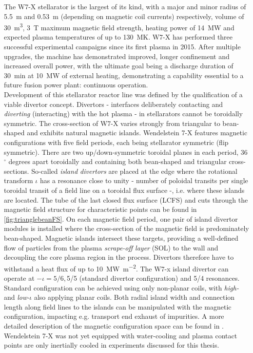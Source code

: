         The W7-X stellarator is the largest of its kind, with a major and minor radius of \SI{5.5}{\meter} and \SI{0.53}{\meter} (depending on magnetic coil currents) respectively, volume of \SI{30}{\cubic\meter}, \SI{3}{\tesla} maximum magnetic field strength, heating power of \SI{14}{\mega\watt} and expected plasma temperatures of up to \SI{130}{\mega\kelvin}. W7-X has performed three successful experimental campaigns since its first plasma in 2015. After multiple upgrades, the machine has demonstrated improved, longer confinement and increased overall power, with the ultimate goal being a discharge duration of \SI{30}{\minute} at \SI{10}{\mega\watt} of external heating, demonstrating a capability essential to a future fusion power plant: continuous operation\cite{Klinger2016_2}.\\%
        Development of this stellarator reactor line was defined by the qualification of a viable divertor concept. Divertors - interfaces deliberately contacting and \textit{diverting} (interacting) with the hot plasma - in stellarators cannot be toroidally symmetric. The cross-section of W7-X varies strongly from triangular to bean-shaped and exhibits natural magnetic islands. Wendelstein 7-X features magnetic configurations with five field periods, each being stellarator symmetric (flip symmetric). There are two up/down-symmetric toroidal planes in each period, 36$^{\circ}$ degrees apart toroidally and containing both bean-shaped and triangular cross-sections. So-called \textit{island divertors} are placed at the edge where the rotational transform $\iota$ has a resonance close to unity - number of poloidal transits per single toroidal transit of a field line on a toroidal flux surface -, i.e. where these islands are located. The tube of the last closed flux surface (LCFS) and cuts through the magnetic field structure for characteristic points can be found in \cref{fig:trianglebeanFS}. On each magnetic field period, one pair of island divertor modules is installed where the cross-section of the magnetic field is predominately bean-shaped. Magnetic islands intersect these targets, providing a well-defined flow of particles from the plasma \textit{scrape-off layer} (SOL) to the wall and decoupling the core plasma region in the process. Divertors therefore have to withstand a heat flux of up to \SI{10}{\mega\watt\per\square\meter}.  
        The W7-x island divertor can operate at $-\iota=5/6$,\,5/5 (standard divertor configuration) and 5/4 resonances. Standard configuration can be achieved using only non-planar coils, with \textit{high-} and \textit{low-}$\iota$ also applying planar coils. Both radial island width and connection length along field lines to the islands can be manipulated with the magnetic configuration, impacting e.g. transport end exhaust of impurities. A more detailed description of the magnetic configuration space can be found in \cite{Geiger2015}. Wendelstein 7-X was not yet equipped with water-cooling and plasma contact points are only inertially cooled in experiments discussed for this thesis\cite{Geiger2015,Beidler1990}.%

